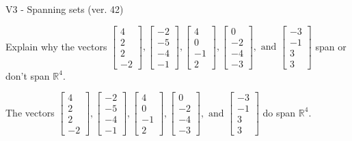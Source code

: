 \begin{exercise}
  \begin{exerciseTitle}V3 - Spanning sets (ver. 42)\end{exerciseTitle}
  \begin{exerciseStatement}
    Explain why the vectors \(\left[\begin{array}{r}
4 \\
2 \\
2 \\
-2
\end{array}\right] , \left[\begin{array}{r}
-2 \\
-5 \\
-4 \\
-1
\end{array}\right] , \left[\begin{array}{r}
4 \\
0 \\
-1 \\
2
\end{array}\right] , \left[\begin{array}{r}
0 \\
-2 \\
-4 \\
-3
\end{array}\right] , \text{ and } \left[\begin{array}{r}
-3 \\
-1 \\
3 \\
3
\end{array}\right]\) span or don't span \(\mathbb{R}^4\). 
	


  \end{exerciseStatement}
  \begin{exerciseAnswer}
   The vectors \(\left[\begin{array}{r}
4 \\
2 \\
2 \\
-2
\end{array}\right] , \left[\begin{array}{r}
-2 \\
-5 \\
-4 \\
-1
\end{array}\right] , \left[\begin{array}{r}
4 \\
0 \\
-1 \\
2
\end{array}\right] , \left[\begin{array}{r}
0 \\
-2 \\
-4 \\
-3
\end{array}\right] , \text{ and } \left[\begin{array}{r}
-3 \\
-1 \\
3 \\
3
\end{array}\right]\) 
  	 do  
	span \(\mathbb{R}^4\).
  



\end{exerciseAnswer}
\end{exercise}
